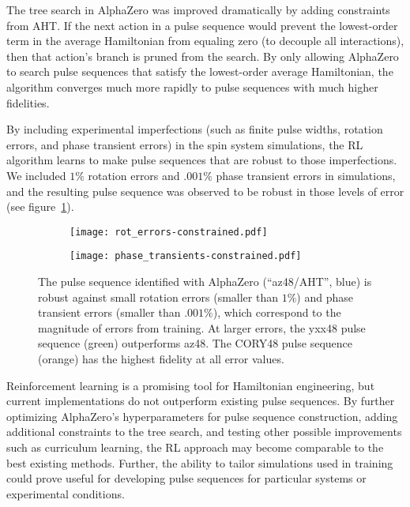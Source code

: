 \documentclass{article}
\begin{document}
The tree search in AlphaZero was improved dramatically by adding constraints from AHT. If the next action in a pulse sequence would prevent the lowest-order term in the average Hamiltonian from equaling zero (to decouple all interactions), then that action's branch is pruned from the search. By only allowing AlphaZero to search pulse sequences that satisfy the lowest-order average Hamiltonian, the algorithm converges much more rapidly to pulse sequences with much higher fidelities.

By including experimental imperfections (such as finite pulse widths, rotation errors, and phase transient errors) in the spin system simulations, the RL algorithm learns to make pulse sequences that are robust to those imperfections. We included $1\%$ rotation errors and $.001\%$ phase transient errors in simulations, and the resulting pulse sequence was observed to be robust in those levels of error (see figure~\ref{fig:fidelity-robust}).

\begin{figure}[H]
    \centering
    \begin{subfigure}{.49\textwidth}
        \centering
        \texttt{[image: rot\_errors-constrained.pdf]}
    \end{subfigure}
    \hfill
    \begin{subfigure}{.49\textwidth}
        \centering
        \texttt{[image: phase\_transients-constrained.pdf]}
    \end{subfigure}
    \caption{The pulse sequence identified with AlphaZero (``az48/AHT'', blue) is robust against small rotation errors (smaller than $1\%$) and phase transient errors (smaller than $.001\%$), which correspond to the magnitude of errors from training. At larger errors, the yxx48 pulse sequence (green) outperforms az48. The CORY48 pulse sequence (orange) has the highest fidelity at all error values.}
    \label{fig:fidelity-robust}
\end{figure}

Reinforcement learning is a promising tool for Hamiltonian engineering, but current implementations do not outperform existing pulse sequences. By further optimizing AlphaZero's hyperparameters for pulse sequence construction, adding additional constraints to the tree search, and testing other possible improvements such as curriculum learning, the RL approach may become comparable to the best existing methods. Further, the ability to tailor simulations used in training could prove useful for developing pulse sequences for particular systems or experimental conditions.

\printbibliography
\end{document}
